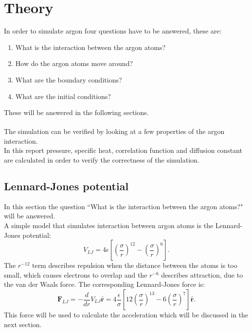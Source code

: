 \documentclass[12pt,a4paper]{report}
\begin{document}
\chapter{Theory}

In order to simulate argon four questions have to be answered, these are:
\begin{enumerate}
 \item What is the interaction between the argon atoms?
 \item How do the argon atoms move around?
 \item What are the boundary conditions?
 \item What are the initial conditions?
\end{enumerate}
These will be answered in the following sections.\\ \\
The simulation can be verified by looking at a few properties of the argon interaction.\\ In this report pressure, specific heat, correlation function and diffusion constant are calculated in order to verify the correctness of the simulation.

\section{Lennard-Jones potential}

In this section the question ``What is the interaction between the argon atoms?" will be answered.\\
A simple model that simulates interaction between argon atoms is the Lennard-Jones potential:
\begin{equation}\label{eq:lennardjones}
V_{LJ}=4\epsilon \left[ \left( \frac{\sigma}{r} \right)^{12} - \left( \frac{\sigma}{r} \right)^{6} \right]\text{.}
\end{equation}
The $r^{-12}$ term describes repulsion when the distance between the atoms is too small, which causes electrons to overlap and the $r^{-6}$ describes attraction, due to the van der Waals force. The corresponding Lennard-Jones force is:
\begin{equation}\label{eq:lennardjonesforce}
\boldsymbol{F}_{LJ}=-\frac{d}{dr}V_{LJ}\hat{\boldsymbol{r}}=4\frac{\epsilon}{\sigma} \left[ 12\left( \frac{\sigma}{r} \right)^{13} - 6\left( \frac{\sigma}{r} \right)^{7} \right]\hat{\boldsymbol{r}}\text{.}
\end{equation}
This force will be used to calculate the acceleration which will be discussed in the next section.
\end{document}
